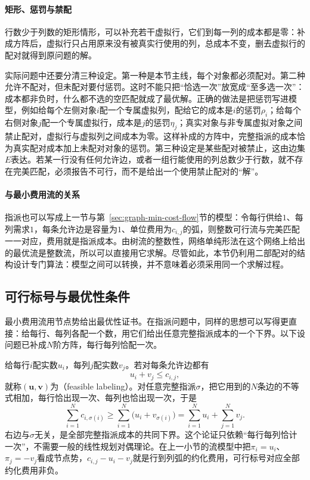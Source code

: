 \paragraph{矩形、惩罚与禁配}
行数少于列数的矩形情形，可以补充若干虚拟行，它们到每一列的成本都是零：补成方阵后，虚拟行只占用原来没有被真实行使用的列，总成本不变，删去虚拟行的配对就得到原问题的解。

实际问题中还要分清三种设定。第一种是本节主线，每个对象都必须配对。第二种允许不配对，但未配对要付惩罚。这时不能只把“恰选一次”放宽成“至多选一次”：成本都非负时，什么都不选的空匹配就成了最优解。正确的做法是把惩罚写进模型，例如给每个左侧对象$i$配一个专属虚拟列，配给它的成本是$i$的惩罚$\rho_i$；给每个右侧对象$j$配一个专属虚拟行，成本是$j$的惩罚$\eta_j$；真实对象与非专属虚拟对象之间禁止配对，虚拟行与虚拟列之间成本为零。这样补成的方阵中，完整指派的成本恰为真实配对成本加上未配对对象的惩罚。第三种设定是某些配对被禁止，这由边集$E$表达。若某一行没有任何允许边，或者一组行能使用的列总数少于行数，就不存在完美匹配，必须报告不可行，而不是给出一个使用禁止配对的“解”。

\paragraph{与最小费用流的关系}
指派也可以写成上一节与第~\ref{sec:graph-min-cost-flow}节的模型：令每行供给$1$、每列需求$1$，每条允许边是容量为$1$、单位费用为$c_{i,j}$的弧，则整数可行流与完美匹配一一对应，费用就是指派成本。由树流的整数性，网络单纯形法在这个网络上给出的最优流是整数流，所以可以直接用它求解。尽管如此，本节仍利用二部配对的结构设计专门算法：模型之间可以转换，并不意味着必须采用同一个求解过程。

\subsection{可行标号与最优性条件}
\label{sec:graph-opt-assign-labels}

最小费用流用节点势给出最优性证书。在指派问题中，同样的思想可以写得更直接：给每行、每列各配一个数，用它们给出任意完整指派成本的一个下界。以下设问题已补成$N$阶方阵，每行每列恰配一次。

给每行$i$配实数$u_i$，每列$j$配实数$v_j$。若对每条允许边都有
\begin{equation}
  u_i+v_j\leq c_{i,j},
  \label{eq:graph-opt-feasible-labels}
\end{equation}
就称$(\bm u,\bm v)$为（feasible labeling）。对任意完整指派$\sigma$，把它用到的$N$条边的不等式相加，每行恰出现一次、每列也恰出现一次，于是
\[
  \sum_{i=1}^Nc_{i,\sigma(i)}\geq\sum_{i=1}^N\bigl(u_i+v_{\sigma(i)}\bigr)=\sum_{i=1}^Nu_i+\sum_{j=1}^Nv_j.
\]
右边与$\sigma$无关，是全部完整指派成本的共同下界。这个论证只依赖“每行每列恰计一次”，不需要一般的线性规划对偶理论。在上一小节的流模型中把$\pi_i=u_i$、$\pi_j=-v_j$看成节点势，$c_{i,j}-u_i-v_j$就是行到列弧的约化费用，可行标号对应全部约化费用非负。

